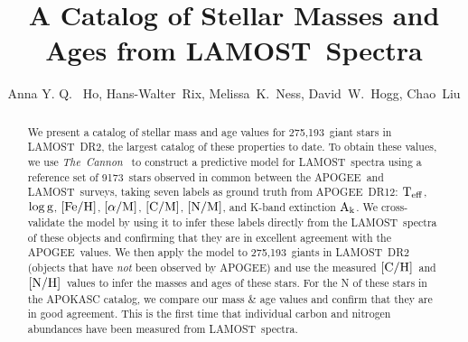 \documentclass[12pt, preprint]{aastex}
\newcommand{\tc}{\textsl{The~Cannon}}
\newcommand{\apogee}{APOGEE}
\newcommand{\lamost}{LAMOST}
\newcommand{\teff}{\mbox{$\rm T_{eff}$}}
\newcommand{\logg}{\mbox{$\rm \log g$}}
\newcommand{\feh}{\mbox{$\rm [Fe/H]$}}
\newcommand{\alpham}{\mbox{$\rm [\alpha/M]$}}
\newcommand{\cm}{\mbox{$\rm [C/M]$}}
\newcommand{\carbon}{\mbox{$\rm [C/H]$}}
\newcommand{\nitrogen}{\mbox{$\rm [N/H]$}}
\newcommand{\nm}{\mbox{$\rm [N/M]$}}
\newcommand{\ak}{\mbox{$\rm A_k$}}
\newcommand{\ntrobj}{9173}
\newcommand{\ntestobj}{275,193}
\begin{document}
\title{A Catalog of Stellar Masses and Ages from \lamost\ Spectra}
\author{Anna Y. Q. ~Ho,
Hans-Walter~Rix,
Melissa~K.~Ness,
David~W.~Hogg, 
Chao~Liu
}


\begin{abstract}

We present a catalog of stellar mass and age values
for \ntestobj\ giant stars in \lamost\ DR2,
the largest catalog of these properties to date.
To obtain these values, we use \tc\ \citep{Ness2015}
to construct a predictive model for \lamost\ spectra 
using a reference set of \ntrobj\ stars observed in common 
between the \apogee\ and \lamost\ surveys,
taking seven labels as ground truth from \apogee\ DR12:
\teff, \logg, \feh, \alpham, \cm, \nm, 
and K-band extinction \ak.
We cross-validate the model by using it to infer these labels 
directly from the \lamost\ spectra of these objects
and confirming that they are in excellent agreement
with the \apogee\ values.
We then apply the model to \ntestobj\ giants
in \lamost\ DR2 (objects that have \emph{not} been observed by \apogee)
and use the measured \carbon\ and \nitrogen\ 
values to infer the masses and ages of these stars.
For the N of these stars in the APOKASC catalog,
we compare our mass \& age values and confirm that they
are in good agreement.
This is the first time that individual carbon and nitrogen
abundances have been measured from \lamost\ spectra.

\end{abstract}

\end{document}
